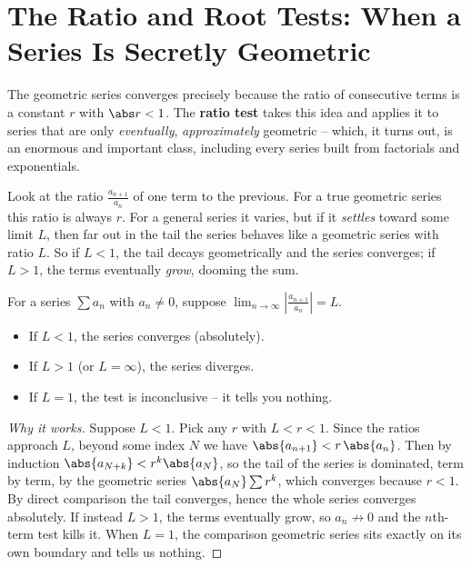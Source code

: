 \section{The Ratio and Root Tests: When a Series Is Secretly Geometric}
\label{ch29:ratio-root}

The geometric series converges precisely because the ratio of consecutive terms is a constant $r$ with $\abs r < 1$. The \textbf{ratio test} takes this idea and applies it to series that are only \emph{eventually}, \emph{approximately} geometric -- which, it turns out, is an enormous and important class, including every series built from factorials and exponentials.

\begin{intuitionbox}
Look at the ratio $\tfrac{a_{n+1}}{a_n}$ of one term to the previous. For a true geometric series this ratio is always $r$. For a general series it varies, but if it \emph{settles} toward some limit $L$, then far out in the tail the series behaves like a geometric series with ratio $L$. So if $L<1$, the tail decays geometrically and the series converges; if $L>1$, the terms eventually \emph{grow}, dooming the sum.
\end{intuitionbox}

\begin{theorem}
\label{ch29:thm-ratio}
For a series $\sum a_n$ with $a_n \neq 0$, suppose $\displaystyle\lim_{n\to\infty}\left|\frac{a_{n+1}}{a_n}\right| = L$.
\begin{itemize}
\item If $L < 1$, the series converges (absolutely).
\item If $L > 1$ (or $L=\infty$), the series diverges.
\item If $L = 1$, the test is inconclusive -- it tells you nothing.
\end{itemize}
\end{theorem}

\begin{proof}[Why it works]
Suppose $L<1$. Pick any $r$ with $L < r < 1$. Since the ratios approach $L$, beyond some index $N$ we have $\abs{a_{n+1}} < r\,\abs{a_n}$. Then by induction $\abs{a_{N+k}} < r^k \abs{a_N}$, so the tail of the series is dominated, term by term, by the geometric series $\abs{a_N}\sum r^k$, which converges because $r<1$. By direct comparison the tail converges, hence the whole series converges absolutely. If instead $L>1$, the terms eventually grow, so $a_n \not\to 0$ and the $n$th-term test kills it. When $L=1$, the comparison geometric series sits exactly on its own boundary and tells us nothing.
\end{proof}

